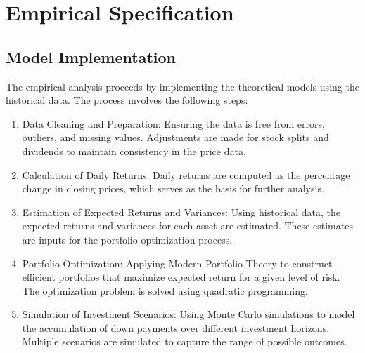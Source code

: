 \section{Empirical Specification}

\subsection{Model Implementation}
The empirical analysis proceeds by implementing the theoretical models using the historical data. The process involves the following steps:
\begin{enumerate}
    \item Data Cleaning and Preparation: Ensuring the data is free from errors, outliers, and missing values. Adjustments are made for stock splits and dividends to maintain consistency in the price data.
    \item Calculation of Daily Returns: Daily returns are computed as the percentage change in closing prices, which serves as the basis for further analysis.
    \item Estimation of Expected Returns and Variances: Using historical data, the expected returns and variances for each asset are estimated. These estimates are inputs for the portfolio optimization process.
    \item Portfolio Optimization: Applying Modern Portfolio Theory to construct efficient portfolios that maximize expected return for a given level of risk. The optimization problem is solved using quadratic programming.
    \item Simulation of Investment Scenarios: Using Monte Carlo simulations to model the accumulation of down payments over different investment horizons. Multiple scenarios are simulated to capture the range of possible outcomes.
\end{enumerate}

